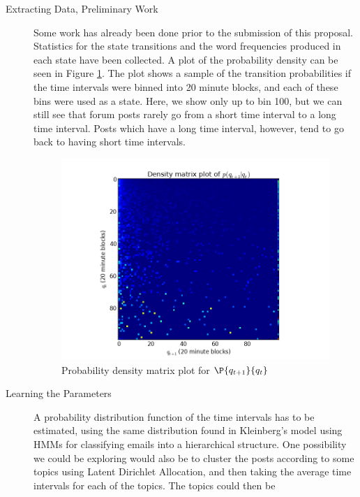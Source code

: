 \documentclass[]{homework}
\begin{document}
\begin{description}
	\item[Extracting Data, Preliminary Work]
Some work has already been done prior to the submission of this proposal.  
Statistics for the state transitions and the word frequencies produced in each 
state have been collected.  A plot of the probability density can be seen in 
Figure \ref{dplot}.  The plot shows a sample of the transition probabilities if 
the time intervals were binned into 20 minute blocks, and each of these bins 
were used as a state.  Here, we show only up to bin 100, but we can still see 
that forum posts rarely go from a short time interval to a long time interval.  
Posts which have a long time interval, however, tend to go back to having short 
time intervals.

\begin{figure}
	\begin{center}
		\includegraphics[scale=0.7]{figure_1.png}
	\end{center}
	\caption{Probability density matrix plot for 
	$\P{q_{t+1}}{q_t}$}\label{dplot}
\end{figure}
	\item[Learning the Parameters]
A probability distribution function of the time intervals has to be estimated, 
using the same distribution found in Kleinberg's model \cite{Kleinberg2003}
using HMMs for classifying emails into a hierarchical structure.
One possibility we could be exploring would also be to cluster the posts 
according to some topics using Latent Dirichlet Allocation, and then taking the 
average time intervals for each of the topics. The topics could then be 

\end{description}
\end{document}
